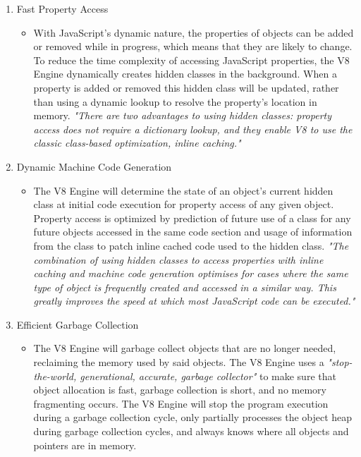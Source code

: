     \begin{enumerate}
    \item Fast Property Access
    	\begin{itemize}
    	\item With JavaScript's dynamic nature, the properties of objects can be added or removed while in progress, which means that they are likely to change. To reduce the time complexity of accessing JavaScript properties, the V8 Engine dynamically creates hidden classes in the background. When a property is added or removed this hidden class will be updated, rather than using a dynamic lookup to resolve the property's location in memory\cite{googleV8}. \emph{"There are two advantages to using hidden classes: property access does not require a dictionary lookup, and they enable V8 to use the classic class-based optimization, inline caching."}\cite{googleV8} 
    	\end{itemize}
    \item Dynamic Machine Code Generation
    	\begin{itemize}
    	\item The V8 Engine will determine the state of an object's current hidden class at initial code execution for property access of any given object. Property access is optimized by prediction of future use of a class for any future objects accessed in the same code section and usage of information from the class to patch inline cached code used to the hidden class\cite{googleV8}. \emph{"The combination of using hidden classes to access properties with inline caching and machine code generation optimises for cases where the same type of object is frequently created and accessed in a similar way. This greatly improves the speed at which most JavaScript code can be executed."}\cite{googleV8}
    	\end{itemize}
    \item Efficient Garbage Collection
    	\begin{itemize}
    	\item The V8 Engine will garbage collect objects that are no longer needed, reclaiming the memory used by said objects. The V8 Engine uses a \emph{"stop-the-world, generational, accurate, garbage collector"}\cite{googleV8} to make sure that object allocation is fast, garbage collection is short, and no memory fragmenting occurs. The V8 Engine will stop the program execution during a garbage collection cycle, only partially processes the object heap during garbage collection cycles, and always knows where all objects and pointers are in memory.\cite{googleV8}
    	\end{itemize}
    \end{enumerate}
    
